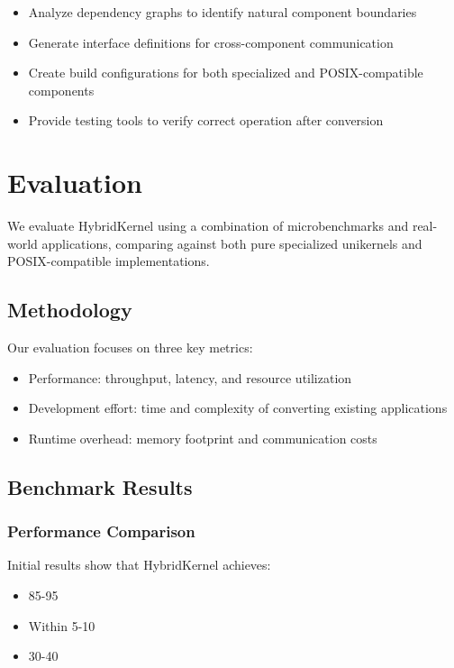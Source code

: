 \documentclass[conference]{IEEEtran}
\begin{document}
\begin{itemize}
	\item Analyze dependency graphs to identify natural component boundaries
	\item Generate interface definitions for cross-component communication
	\item Create build configurations for both specialized and POSIX-compatible components
	\item Provide testing tools to verify correct operation after conversion
\end{itemize}

\section{Evaluation}
We evaluate HybridKernel using a combination of microbenchmarks and real-world applications, comparing against both pure specialized unikernels and POSIX-compatible implementations.

\subsection{Methodology}
Our evaluation focuses on three key metrics:
\begin{itemize}
	\item Performance: throughput, latency, and resource utilization
	\item Development effort: time and complexity of converting existing applications
	\item Runtime overhead: memory footprint and communication costs
\end{itemize}

\subsection{Benchmark Results}
\subsubsection{Performance Comparison}
Initial results show that HybridKernel achieves:
\begin{itemize}
	\item 85-95%
	\item Within 5-10%
	\item 30-40%
\end{itemize}
\end{document}
